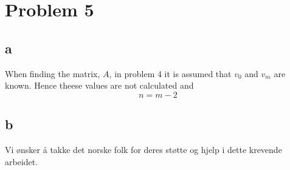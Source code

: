 \documentclass[english,notitlepage]{revtex4-1}  %
\begin{document}
\section*{Problem 5}
    \subsection*{a}
        \label{sec:oppgave5a}
        When finding the matrix, $A$, in problem 4 it is assumed that $v_0$ and $v_m$ are known.
        Hence theese values are not calculated and
        \begin{equation*}
                n
            =   m - 2
        \end{equation*}
    
    \subsection*{b}
        \label{sec:oppgave5b}







\begin{acknowledgements}
Vi ønsker å takke det norske folk for deres støtte og hjelp i dette krevende arbeidet. 
\end{acknowledgements}

   
\end{document}
